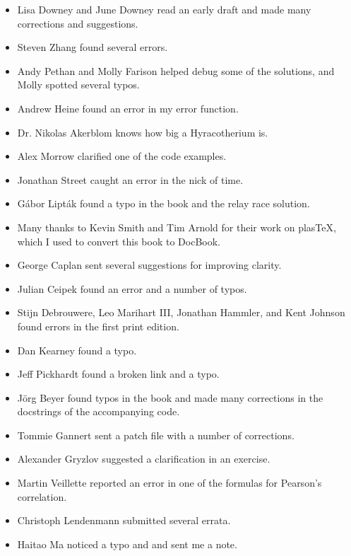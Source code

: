 \documentclass[12pt]{book}
\begin{document}
\begin{itemize}

\item Lisa Downey and June Downey read an early draft and made many
corrections and suggestions.

\item Steven Zhang found several errors.

\item Andy Pethan and Molly Farison helped debug some of the solutions,
and Molly spotted several typos.

\item Andrew Heine found an error in my error function.

\item Dr. Nikolas Akerblom knows how big a Hyracotherium is.

\item Alex Morrow clarified one of the code examples.

\item Jonathan Street caught an error in the nick of time.

\item G\'{a}bor Lipt\'{a}k found a typo in the book and the relay race solution.

\item Many thanks to Kevin Smith and Tim Arnold for their work on
plasTeX, which I used to convert this book to DocBook.

\item George Caplan sent several suggestions for improving clarity.

\item Julian Ceipek found an error and a number of typos.

\item Stijn Debrouwere, Leo Marihart III, Jonathan Hammler, and Kent Johnson
found errors in the first print edition.

\item Dan Kearney found a typo.

\item Jeff Pickhardt found a broken link and a typo.

\item J\"{o}rg Beyer found typos in the book and made many corrections
in the docstrings of the accompanying code.

\item Tommie Gannert sent a patch file with a number of corrections.

\item Alexander Gryzlov suggested a clarification in an exercise.

\item Martin Veillette reported an error in one of the formulas for
Pearson's correlation.

\item Christoph Lendenmann submitted several errata.

\item Haitao Ma noticed a typo and and sent me a note.


\end{itemize}
\end{document}
